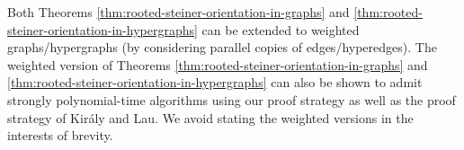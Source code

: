 Both Theorems \ref{thm:rooted-steiner-orientation-in-graphs} and \ref{thm:rooted-steiner-orientation-in-hypergraphs} can be extended to weighted graphs/hypergraphs (by considering parallel copies of edges/hyperedges). The weighted version of Theorems \ref{thm:rooted-steiner-orientation-in-graphs} and \ref{thm:rooted-steiner-orientation-in-hypergraphs} can also be shown to admit strongly polynomial-time algorithms using our proof strategy as well as the proof strategy of Kir\'{a}ly and Lau. We avoid stating the weighted versions in the interests of brevity. 




